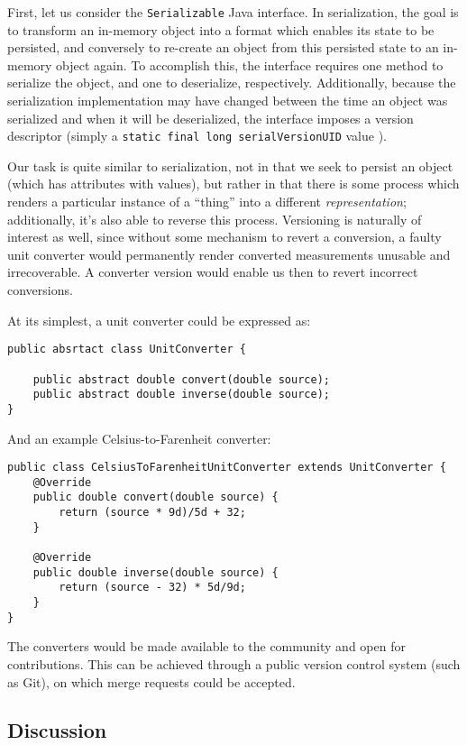First, let us consider the \texttt{Serializable} Java interface. In
serialization, the goal is to transform an in-memory object into a
format which enables its state to be persisted, and conversely to
re-create an object from this persisted state to an in-memory object
again. To accomplish this, the interface requires one method to
serialize the object, and one to deserialize, respectively.
Additionally, because the serialization implementation may have changed
between the time an object was serialized and when it will be
deserialized, the interface imposes a version descriptor (simply a
\texttt{static\ final\ long\ serialVersionUID} value ).

Our task is quite similar to serialization, not in that we seek to
persist an object (which has attributes with values), but rather in that
there is some process which renders a particular instance of a ``thing''
into a different \emph{representation}; additionally, it's also able to
reverse this process. Versioning is naturally of interest as well, since
without some mechanism to revert a conversion, a faulty unit converter
would permanently render converted measurements unusable and
irrecoverable. A converter version would enable us then to revert
incorrect conversions.

At its simplest, a unit converter could be expressed as:

\begin{verbatim}
public absrtact class UnitConverter {

    public abstract double convert(double source);
    public abstract double inverse(double source);
}
\end{verbatim}

And an example Celsius-to-Farenheit converter:

\begin{verbatim}
public class CelsiusToFarenheitUnitConverter extends UnitConverter {
    @Override
    public double convert(double source) {
        return (source * 9d)/5d + 32;
    }

    @Override
    public double inverse(double source) {
        return (source - 32) * 5d/9d;
    }
}
\end{verbatim}

The converters would be made available to the community and open for
contributions. This can be achieved through a public version control
system (such as Git), on which merge requests could be accepted.

\subsection{Discussion}\label{discussion}

